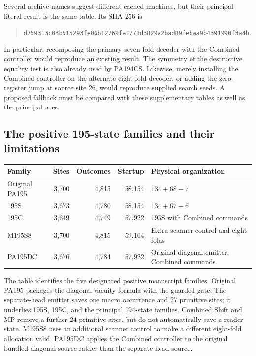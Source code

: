 Several archive names suggest different cached machines, but their
principal literal result is the same table. Its SHA-256 is
\begin{quote}\small
\nolinkurl{d759313c03b515293fe06b12769fa1771d3829a2bad89febaa9b4391990f3a4b}.
\end{quote}
In particular, recomposing the primary seven-fold decoder with the
Combined controller would reproduce an existing result. The symmetry
of the destructive equality test is also already used by PA194CS.
Likewise, merely installing the Combined controller on the alternate
eight-fold decoder, or adding the zero-register jump at source site 26,
would reproduce supplied search seeds. A proposed fallback must be
compared with these supplementary tables as well as the principal ones.

\subsection{The positive 195-state families and their limitations}

\begin{center}\small
\begin{tabular}{@{}lrrrl@{}}
\toprule
Family & Sites & Outcomes & Startup & Physical organization\\
\midrule
Original PA195 & 3,700 & 4,815 & 58,154 & $134+68-7$\\
195S & 3,673 & 4,780 & 58,154 & $134+67-6$\\
195C & 3,649 & 4,749 & 57,922 & 195S with Combined commands\\
M195S8 & 3,700 & 4,815 & 59,164 & Extra scanner control and eight folds\\
PA195DC & 3,676 & 4,784 & 57,922 & Original diagonal emitter, Combined commands\\
\bottomrule
\end{tabular}
\end{center}

The table identifies the five designated positive manuscript families.
Original PA195 packages the diagonal-vacuity formula with the guarded
gate. The separate-head emitter saves one macro occurrence and 27
primitive sites; it underlies 195S, 195C, and the principal 194-state
families. Combined Shift and MP remove a further 24 primitive sites,
but do not automatically save a reader state. M195S8 uses an additional
scanner control to make a different eight-fold allocation valid.
PA195DC applies the Combined controller to the original bundled-diagonal
source rather than the separate-head source.

